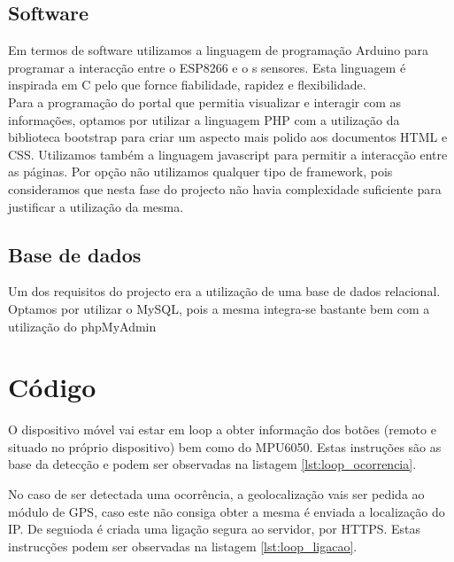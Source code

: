 \FloatBarrier\subsection{Software}

Em termos de software utilizamos a linguagem de programação Arduino\cite{language} para programar a interacção entre o ESP8266 e o s sensores. Esta linguagem é inspirada em C pelo que fornce fiabilidade, rapidez e flexibilidade.\\
Para a programação do portal que permitia visualizar e interagir com as informações, optamos por utilizar a linguagem PHP\cite{PHP} com a utilização da biblioteca bootstrap\cite{bootstrap} para criar um aspecto mais polido aos documentos HTML e CSS. Utilizamos também a linguagem javascript \cite{javascript} para permitir a interacção entre as páginas. Por opção não utilizamos qualquer tipo de framework, pois consideramos que nesta fase do projecto não havia complexidade suficiente para justificar a utilização da mesma.

\FloatBarrier\subsection{Base de dados}

Um dos requisitos do projecto era a utilização de uma base de dados relacional. Optamos por utilizar o MySQL, pois a mesma integra-se bastante bem com a utilização do phpMyAdmin \cite{phpmyadmin}

\section{Código}

O dispositivo móvel vai estar em loop a obter informação dos botões (remoto e situado no próprio dispositivo) bem como do MPU6050. Estas instruções são as base da detecção e podem ser observadas na listagem \ref{lst:loop_ocorrencia}.



No caso de ser detectada uma ocorrência, a geolocalização vais ser pedida ao módulo de GPS, caso este não consiga obter a mesma é enviada a localização do IP. De seguioda é criada uma ligação segura ao servidor, por HTTPS. Estas instrucções podem ser observadas na listagem \ref{lst:loop_ligacao}.



